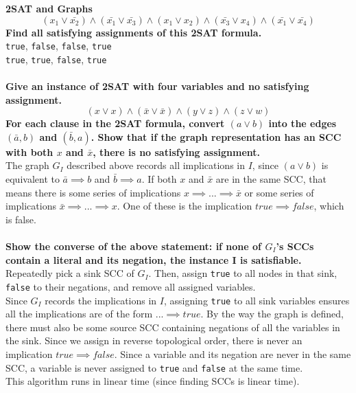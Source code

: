 \begin{problem}{3.28}
    \textbf{2SAT and Graphs}
    \[
        (x_1 \lor \bar{x_2}) \wedge (\bar{x_1} \lor \bar{x_3}) \wedge (x_1 \lor x_2) \wedge (\bar{x_3} \lor x_4) \wedge (\bar{x_1} \lor \bar{x_4})
    \]
    \textbf{Find all satisfying assignments of this 2SAT formula.}
    \\
    \texttt{true}, \texttt{false}, \texttt{false}, \texttt{true}
    \\
    \texttt{true}, \texttt{true}, \texttt{false}, \texttt{true}
    \\
    \\
    \textbf{Give an instance of 2SAT with four variables and no satisfying assignment.}
    \[
        (x \lor x) \wedge (\bar{x} \lor \bar{x}) \wedge (y \lor z) \wedge (z \lor w)
    \]
    \textbf{For each clause in the 2SAT formula, convert $(a \lor b)$ into the edges $(\bar{a}, b)$ and $(\bar{b}, a)$. Show that if the graph representation has an SCC with both $x$ and $\bar{x}$, there is no satisfying assignment.}
    \\
    The graph $G_I$ described above records all implications in $I$, since $(a \lor b)$ is equivalent to $\bar{a} \implies b$ and $\bar{b} \implies a$. If both $x$ and $\bar{x}$ are in the same SCC, that means there is some series of implications $x \implies ... \implies \bar{x}$ or some series of implications $\bar{x} \implies ... \implies x$. One of these is the implication $true \implies false$, which is false.
    \\
    \\
    \textbf{Show the converse of the above statement: if none of $G_I$'s SCCs contain a literal and its negation, the instance I is satisfiable.}
    \\
    Repeatedly pick a sink SCC of $G_I$. Then, assign \texttt{true} to all nodes in that sink, \texttt{false} to their negations, and remove all assigned variables. 
    \\
    Since $G_I$ records the implications in $I$, assigning \texttt{true} to all sink variables ensures all the implications are of the form $... \implies true$. By the way the graph is defined, there must also be some source SCC containing negations of all the variables in the sink. Since we assign in reverse topological order, there is never an implication $true \implies false$. Since a variable and its negation are never in the same SCC, a variable is never assigned to \texttt{true} and \texttt{false} at the same time.
    \\
    This algorithm runs in linear time (since finding SCCs is linear time). 

\end{problem}

